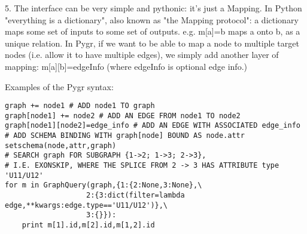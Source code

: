 \documentclass{howto}
\begin{document}
   5. The interface can be very simple and pythonic: it's just a Mapping.  In Python "everything is a dictionary", also known as "the Mapping protocol": a dictionary maps some set of inputs to some set of outputs. e.g. m[a]=b maps a onto b, as a unique relation.  In Pygr, if we want to be able to map a node to multiple target nodes (i.e. allow it to have multiple edges), we simply add another layer of mapping: m[a][b]=edgeInfo (where edgeInfo is optional edge info.)

Examples of the Pygr syntax:

\begin{verbatim}
graph += node1 # ADD node1 TO graph
graph[node1] += node2 # ADD AN EDGE FROM node1 TO node2
graph[node1][node2]=edge_info # ADD AN EDGE WITH ASSOCIATED edge_info
# ADD SCHEMA BINDING WITH graph[node] BOUND AS node.attr
setschema(node,attr,graph) 
# SEARCH graph FOR SUBGRAPH {1->2; 1->3; 2->3}, 
# I.E. EXONSKIP, WHERE THE SPLICE FROM 2 -> 3 HAS ATTRIBUTE type 'U11/U12' 
for m in GraphQuery(graph,{1:{2:None,3:None},\
                   2:{3:dict(filter=lambda edge,**kwargs:edge.type=='U11/U12')},\
                   3:{}}):
    print m[1].id,m[2].id,m[1,2].id
\end{verbatim}
\end{document}
